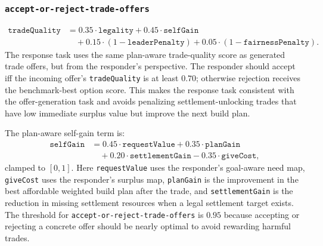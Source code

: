 \documentclass{article}
\begin{document}
\subsubsection{\texttt{accept-or-reject-trade-offers}}
\label{app:task-accept-or-reject-trade-offers}
\[
\begin{aligned}
\texttt{tradeQuality}
&= 0.35 \cdot \texttt{legality}
+ 0.45 \cdot \texttt{selfGain} \\
&\quad + 0.15 \cdot (1 - \texttt{leaderPenalty})
+ 0.05 \cdot (1 - \texttt{fairnessPenalty}).
\end{aligned}
\]
The response task uses the same plan-aware trade-quality score as generated trade offers, but from the responder's perspective. The responder should accept iff the incoming offer's \texttt{tradeQuality} is at least $0.70$; otherwise rejection receives the benchmark-best option score. This makes the response task consistent with the offer-generation task and avoids penalizing settlement-unlocking trades that have low immediate surplus value but improve the next build plan.

The plan-aware self-gain term is:
\[
\begin{aligned}
\texttt{selfGain}
&= 0.45 \cdot \texttt{requestValue}
+ 0.35 \cdot \texttt{planGain} \\
&\quad + 0.20 \cdot \texttt{settlementGain}
- 0.35 \cdot \texttt{giveCost},
\end{aligned}
\]
clamped to $[0,1]$. Here \texttt{requestValue} uses the responder's goal-aware need map, \texttt{giveCost} uses the responder's surplus map, \texttt{planGain} is the improvement in the best affordable weighted build plan after the trade, and \texttt{settlementGain} is the reduction in missing settlement resources when a legal settlement target exists.
\\
The threshold for \texttt{accept-or-reject-trade-offers} is $0.95$ because accepting or rejecting a concrete offer should be nearly optimal to avoid rewarding harmful trades.
\end{document}
